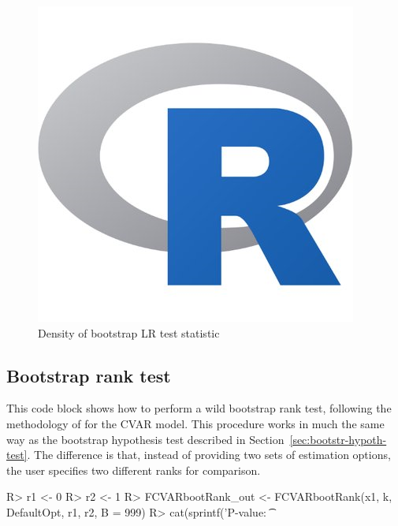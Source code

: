 \documentclass[article]{jss}
\begin{document}
\begin{figure}[tbh]
  \centering
  \caption{Density of bootstrap LR test statistic}
  \label{fig:BS}
  \includegraphics[scale = 1, keepaspectratio=true]{Figures/LRdensity_bw045.png}
\end{figure}


\subsection{Bootstrap rank test}
\label{sec:bootstrap-rank-test}

This code block
shows how to perform a wild bootstrap rank test, following the methodology of \cite{Cavaliere2010} for the CVAR model. This procedure works in much the same way as the bootstrap hypothesis test described in Section~\ref{sec:bootstr-hypoth-test}. The difference is that, instead of providing two sets of estimation options, the user specifies two different ranks for comparison.

\begin{Code}
R> r1 <- 0
R> r2 <- 1
R> FCVARbootRank_out <- FCVARbootRank(x1, k, DefaultOpt, r1, r2, B = 999)
R> cat(sprintf('P-value: \t %
\end{Code}
\end{document}
